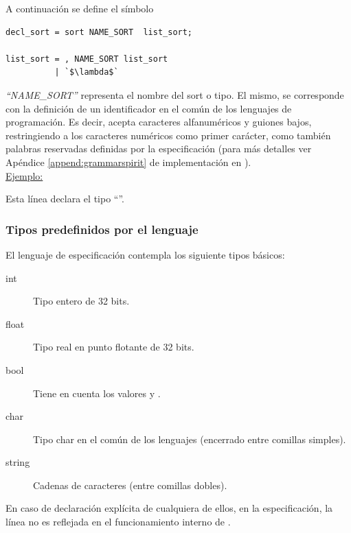 A continuación se define el símbolo 

\begin{lstlisting}[frame=shadowbox, language=specmag, linewidth=8cm]
decl_sort = sort NAME_SORT  list_sort;

list_sort = , NAME_SORT list_sort
          | `$\lambda$`
\end{lstlisting}

\textit{``NAME\_SORT''} representa el nombre del sort o tipo. El mismo, se corresponde con la definición de un identificador en el común de los lenguajes de programación. Es decir, acepta caracteres alfanuméricos y guiones bajos, restringiendo a los caracteres numéricos como primer carácter, como también palabras reservadas definidas por la especificación (para más detalles ver Apéndice \ref{append:grammarspirit} de implementación en \spirit).\\

\underline{Ejemplo:} \begin{center}  \end{center}
\vspace{0.2cm}
Esta línea declara el tipo ``''.

\subsubsection{Tipos predefinidos por el lenguaje}
\label{sec:typepredefined}

El lenguaje de especificación contempla los siguiente tipos básicos:

\begin{description}
\item [int] Tipo entero de 32 bits.

\item [float] Tipo real en punto flotante de 32 bits.

\item [bool] Tiene en cuenta los valores  y .

\item [char] Tipo char en el común de los lenguajes (encerrado entre comillas simples).

\item [string] Cadenas de caracteres (entre comillas dobles).
\end{description}

En caso de declaración explícita de cualquiera de ellos, en la especificación, la línea no es reflejada en el funcionamiento interno de \maggen.

